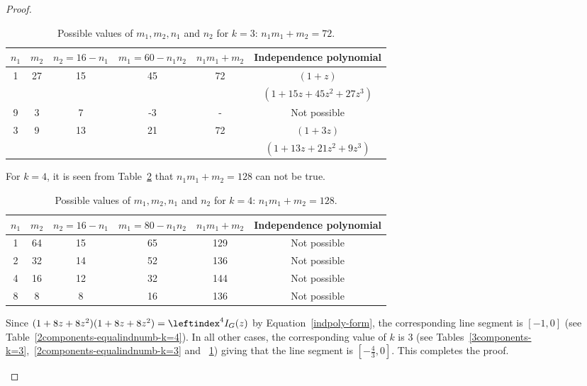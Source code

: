\documentclass[12pt,a4paper]{article}
\theoremstyle{plain}
\newcounter{cases}
\numberwithin{equation}{section}
\begin{document}
\begin{proof}
\begin{enumerate}
\begin{table}[h!]
\centering
    \caption{Possible values of $m_1, m_2, n_1$ and $n_2$ for $k=3$: $n_1m_1 + m_2 =72$. }
    \begin{tabular}{|c|c|c|c|c|c|}
    \hline
      $n_1$ & $m_2$ & $n_2 =16-n_1$ & $m_1=60-n_1 n_2$ & $n_1m_1 + m_2$ & Independence polynomial \\
      \hline
       1 & 27 & 15 & 45 & 72 & $(1+z)$\\
               &   &   &   &   & $ (1+15z+45z^2+27z^3)$\\ \hline
       9 & 3 & 7 & -3 & - & Not possible\\ \hline 
       3 & 9 & 13 & 21  & 72 & $(1+3z)$\\ 
         &  &  &   &  & $(1+13z+21z^2+9z^3)$\\  \hline
    \end{tabular}
    \label{3components-unequal-k=3}
\end{table}
For $k=4$, it is seen from Table~\ref{3components-unequal-k=4} that $n_1m_1 + m_2 =128$ can not be true.
\begin{table}[h!]
\centering
    \caption{Possible values of $m_1, m_2, n_1$ and $n_2$ for $k=4$: $n_1m_1 + m_2 =128$.}
    \begin{tabular}{|c|c|c|c|c|c|}
    \hline
      $n_1$ & $m_2$ & $n_2=16-n_1$ & $m_1 =80-n_1 n_2$ & $n_1m_1 + m_2$ &Independence polynomial \\
      \hline
       1 & 64 & 15 & 65 & 129 & Not possible\\ \hline
       2 & 32 & 14 & 52 & 136 & Not possible\\ \hline
       4 & 16 & 12 & 32  & 144 & Not possible\\ \hline
       8 & 8 & 8 & 16  & 136 & Not possible\\ \hline
    \end{tabular}
    \label{3components-unequal-k=4}
\end{table}
\par Since $(1+8z+8z^2)(1+8z+8z^2) =  \leftindex^4{I}_G(z)$ by Equation~\ref{indpoly-form}, the corresponding line segment is $[-1,0]$ (see Table~\ref{2components-equalindnumb-k=4}). In all other cases, the corresponding value of $k$ is $3$ (see Tables~\ref{3components-k=3},~\ref{2components-equalindnumb-k=3} and ~\ref{3components-unequal-k=3}) giving that the line segment is $[-\frac{4}{3},0]$.
This completes the proof.
\end{enumerate}
\end{proof}
\end{document}
